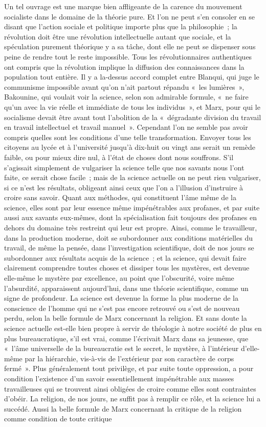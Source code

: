 \documentclass[french,twoside]{book} %
\begin{document}
Un tel ouvrage est une marque bien affligeante de la carence du mouvement socialiste dans le domaine de la théorie pure. Et l'on ne peut s'en consoler en se disant que l'action sociale et politique importe plus que la philosophie ; la révolution doit être une révolution intellectuelle autant que sociale, et la spéculation purement théorique y a sa tâche, dont elle ne peut se dispenser sous peine de rendre tout le reste impossible. Tous les révolutionnaires authentiques ont compris que la révolution implique la diffusion des connaissances dans la population tout entière. Il y a la-dessus accord complet entre Blanqui, qui juge le communisme impossible avant qu'on n'ait partout répandu « les lumières », Bakounine, qui voulait voir la science, selon son admirable formule, « ne faire qu'un avec la vie réelle et immédiate de tous les individus », et Marx, pour qui le socialisme devait être avant tout l'abolition de la « dégradante division du travail en travail intellectuel et travail manuel ». Cependant l'on ne semble pas avoir compris quelles sont les conditions d'une telle transformation. Envoyer tous les citoyens au lycée et à l'université jusqu'à dix-huit ou vingt ans serait un remède faible, ou pour mieux dire nul, à l'état de choses dont nous souffrons. S'il s'agissait simplement de vulgariser la science telle que nos savants nous l'ont faite, ce serait chose facile ; mais de la science actuelle on ne peut rien vulgariser, si ce n'est les résultats, obligeant ainsi ceux que l'on a l'illusion d'instruire à croire sans savoir. Quant aux méthodes, qui constituent l'âme même de la science, elles sont par leur essence même impénétrables aux profanes, et par suite aussi aux savants eux-mêmes, dont la spécialisation fait toujours des profanes en dehors du domaine très restreint qui leur est propre. Ainsi, comme le travailleur, dans la production moderne, doit se subordonner aux conditions matérielles du travail, de même la pensée, dans l'investigation scientifique, doit de nos jours se subordonner aux résultats acquis de la science ; et la science, qui devait faire clairement comprendre toutes choses et dissiper tous les mystères, est devenue elle-même le mystère par excellence, au point que l'obscurité, voire même l'absurdité, apparaissent aujourd'hui, dans une théorie scientifique, comme un signe de profondeur. La science est devenue la forme la plus moderne de la conscience de l'homme qui ne s'est pas encore retrouvé ou s'est de nouveau perdu, selon la belle formule de Marx concernant la religion. Et sans doute la science actuelle est-elle bien propre à servir de théologie à notre société de plus en plus bureaucratique, s'il est vrai, comme l'écrivait Marx dans sa jeunesse, que « l'âme universelle de la bureaucratie est le secret, le mystère, à l'intérieur d'elle-même par la hiérarchie, vis-à-vis de l'extérieur par son caractère de corps fermé ». Plus généralement tout privilège, et par suite toute oppression, a pour condition l'existence d'un savoir essentiellement impénétrable aux masses travailleuses qui se trouvent ainsi obligées de croire comme elles sont contraintes d'obéir. La religion, de nos jours, ne suffit pas à remplir ce rôle, et la science lui a succédé. Aussi la belle formule de Marx concernant la critique de la religion comme condition de toute critique 
\end{document}
